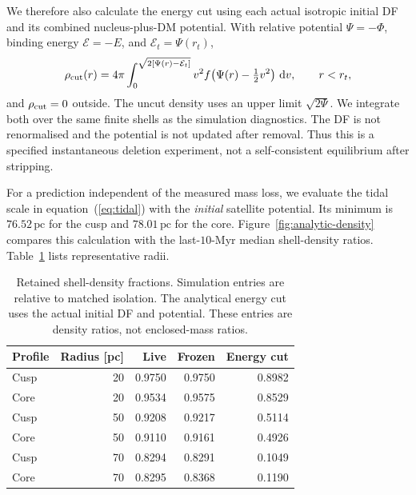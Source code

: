 \documentclass[11pt,a4paper]{article}
\newcommand{\pc}{\,\mathrm{pc}}
\begin{document}
We therefore also calculate the energy cut using each actual isotropic
initial DF and its combined nucleus-plus-DM potential. With relative
potential $\Psi=-\Phi$, binding energy $\mathcal E=-E$, and
$\mathcal E_t=\Psi(r_t)$,
\begin{equation}
 \rho_{\rm cut}(r)=4\pi\int_0^{\sqrt{2[\Psi(r)-\mathcal E_t]}}
 v^2 f\!\left(\Psi(r)-\tfrac12v^2\right)\,\mathrm{d}v,
 \qquad r<r_t,
 \label{eq:actual-cut}
\end{equation}
and $\rho_{\rm cut}=0$ outside. The uncut density uses an upper limit
$\sqrt{2\Psi}$. We integrate both over the same finite shells as the
simulation diagnostics. The DF is not renormalised and the potential is not
updated after removal. Thus this is a specified instantaneous deletion
experiment, not a self-consistent equilibrium after stripping.

For a prediction independent of the measured mass loss, we evaluate the
tidal scale in equation~(\ref{eq:tidal}) with the \emph{initial} satellite
potential. Its minimum is $76.52\pc$ for the cusp and $78.01\pc$ for the
core. Figure~\ref{fig:analytic-density} compares this calculation with the
last-$10$-Myr median shell-density ratios. Table~\ref{tab:analytic-density}
lists representative radii.

\begin{table}[htbp]
\centering\small
\caption{Retained shell-density fractions. Simulation entries are relative
to matched isolation. The analytical energy cut uses the actual initial DF
and potential. These entries are density ratios, not enclosed-mass ratios.}
\label{tab:analytic-density}
\begin{tabular}{lrrrr}
\toprule
Profile & Radius [pc] & Live & Frozen & Energy cut\\
\midrule
Cusp & 20 & 0.9750 & 0.9750 & 0.8982\\
Core & 20 & 0.9534 & 0.9575 & 0.8529\\
Cusp & 50 & 0.9208 & 0.9217 & 0.5114\\
Core & 50 & 0.9110 & 0.9161 & 0.4926\\
Cusp & 70 & 0.8294 & 0.8291 & 0.1049\\
Core & 70 & 0.8295 & 0.8368 & 0.1190\\
\bottomrule
\end{tabular}
\end{table}
\end{document}
